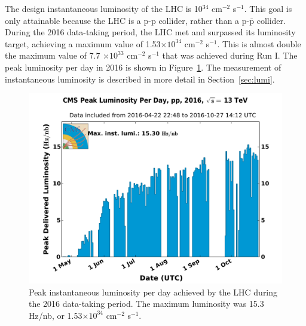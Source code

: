 The design instantaneous luminosity of the LHC is 10$^{34}$ cm$^{-2}$ s$^{-1}$. This goal is only attainable because the LHC is a p-p collider, rather than a p-$\bar{\mathrm{p}}$ collider. During the 2016 data-taking period, the LHC met and surpassed its luminosity target, achieving a maximum value of 1.53$\times 10^{34}$ cm$^{-2}$ s$^{-1}$. This is almost double the maximum value of 7.7 $\times 10^{33}$ cm$^{-2}$ s$^{-1}$ that was achieved during Run I. The peak luminosity per day in 2016 is shown in Figure~\ref{fig:instLumi}. The measurement of instantaneous luminosity is described in more detail in Section~\ref{sec:lumi}. 

\begin{figure}[h!]
	\centering
	\includegraphics[width=\linewidth]{Figures/LHC/peak_lumi_per_day_pp_2016.pdf}
       \caption{Peak instantaneous luminosity per day achieved by the LHC during the 2016 data-taking period. 
       The maximum luminosity was 15.3 Hz/nb, or 1.53$\times 10^{34}$ cm$^{-2}$ s$^{-1}$. }
       \label{fig:instLumi}
\end{figure}





